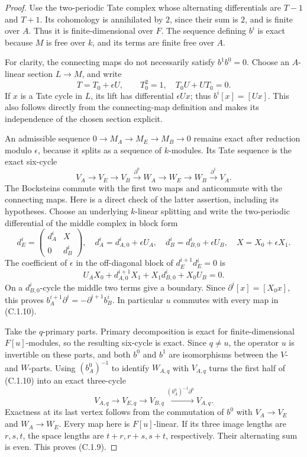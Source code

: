 \begin{proof}
Use the two-periodic Tate complex whose alternating differentials
are $T-1$ and $T+1$. Its cohomology is annihilated by $2$, since their
sum is $2$, and is finite over $A$. Thus it is finite-dimensional
over $F$. The sequence defining $b^i$ is exact because $M$ is free
over $k$, and its terms are finite free over $A$.

For clarity, the connecting maps do not necessarily satisfy
$b^1b^0=0$. Choose an $A$-linear section $L\to M$, and write
\[
 T=T_0+\epsilon U,\qquad T_0^2=1,\quad T_0U+UT_0=0.
\]
If $x$ is a Tate cycle in $L$, its lift has differential
$\epsilon Ux$; thus $b^i[x]=[Ux]$. This also follows directly
from the connecting-map definition and makes its independence of
the chosen section explicit.

An admissible sequence $0\to M_A\to M_E\to M_B\to0$ remains
exact after reduction modulo $\epsilon$, because it splits as a
sequence of $k$-modules. Its Tate sequence is the exact six-cycle
\[
 V_A\longrightarrow V_E\longrightarrow V_B
 \xrightarrow{\partial^0}W_A\longrightarrow W_E
 \longrightarrow W_B\xrightarrow{\partial^1}V_A.       \tag{C.1.10}
\]
The Bocksteins commute with the first two maps and anticommute
with the connecting maps. Here is a direct check of the latter
assertion, including its hypotheses. Choose an underlying $k$-linear
splitting and write the two-periodic differential of the middle
complex in block form
\[
 d_E^i=\begin{pmatrix}d_A^i&X\\0&d_B^i\end{pmatrix},
 \quad d_A^i=d_{A,0}^i+\epsilon U_A,\quad
 d_B^i=d_{B,0}^i+\epsilon U_B,\quad X=X_0+\epsilon X_1.
\]
The coefficient of $\epsilon$ in the off-diagonal block of
$d_E^{i+1}d_E^i=0$ is
\[
 U_AX_0+d_{A,0}^{i+1}X_1+X_1d_{B,0}^i+X_0U_B=0.
\]
On a $d_{B,0}^i$-cycle the middle two terms give a boundary.
Since $\partial^i[x]=[X_0x]$, this proves
$b_A^{i+1}\partial^i=-\partial^{i+1}b_B^i$.
In particular $u$ commutes with every map in (C.1.10).

Take the $q$-primary parts. Primary decomposition is exact for
finite-dimensional $F[u]$-modules, so the resulting six-cycle is
exact. Since $q\ne u$, the operator $u$ is invertible on these
parts, and both $b^0$ and $b^1$ are isomorphisms between the
$V$- and $W$-parts. Using $(b_A^0)^{-1}$ to identify $W_{A,q}$
with $V_{A,q}$ turns the first half of (C.1.10) into an exact
three-cycle
\[
 V_{A,q}\longrightarrow V_{E,q}\longrightarrow V_{B,q}
 \xrightarrow{(b_A^0)^{-1}\partial^0}V_{A,q}.
\]
Exactness at its last vertex follows from the commutation of $b^0$
with $V_A\to V_E$ and $W_A\to W_E$. Every map here is
$F[u]$-linear. If its three image lengths are $r,s,t$, the space
lengths are $t+r,r+s,s+t$, respectively. Their alternating sum
is even. This proves (C.1.9).
\end{proof}

